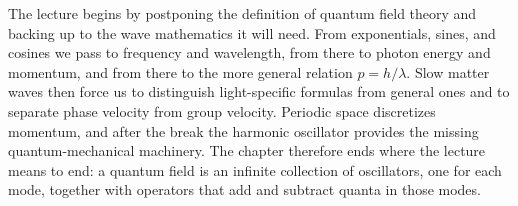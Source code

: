 The lecture begins by postponing the definition of quantum field theory and backing up to the wave mathematics it will need. From exponentials, sines, and cosines we pass to frequency and wavelength, from there to photon energy and momentum, and from there to the more general relation \(p=h/\lambda\). Slow matter waves then force us to distinguish light-specific formulas from general ones and to separate phase velocity from group velocity. Periodic space discretizes momentum, and after the break the harmonic oscillator provides the missing quantum-mechanical machinery. The chapter therefore ends where the lecture means to end: a quantum field is an infinite collection of oscillators, one for each mode, together with operators that add and subtract quanta in those modes.